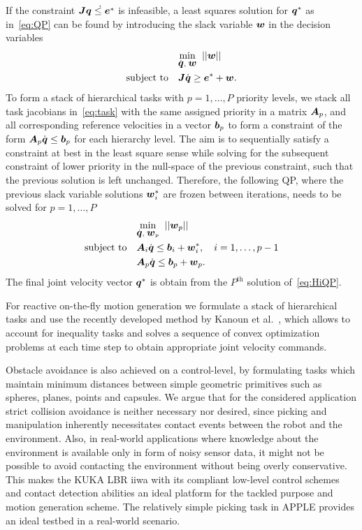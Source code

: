 If the constraint $\mbox{\boldmath $J$}\dot{\mbox{\boldmath $q$} \leq \mbox{\boldmath $e$}^*}$ is infeasible, a least squares solution for
$\mbox{\boldmath $q$}^*$ as in~\eqref{eq:QP} can be found by introducing the slack variable $\mbox{\boldmath $w$}$ in the
decision variables
%
\begin{align}\label{eq:iQP}
  &\underset{\dot{\mbox{\boldmath $q$}},\;\mbox{\boldmath $w$}}{\mbox{min}}\;\;||\mbox{\boldmath $w$}||\\
   \mbox{subject to} \quad &\mbox{\boldmath $J$}\dot{\mbox{\boldmath $q$}} \geq \mbox{\boldmath $e$}^* + \mbox{\boldmath $w$}. \nonumber
\end{align}
%
To form a stack of hierarchical tasks with $p=1,\dots,P$ priority levels, we stack all task
jacobians in~\eqref{eq:task} with the same assigned priority in a matrix $\mbox{\boldmath $A$}_p$, and all
corresponding reference velocities in a vector $\mbox{\boldmath $b$}_p$ to form a constraint of the form
$\mbox{\boldmath $A$}_p\dot{\mbox{\boldmath $q$}}\leq \mbox{\boldmath $b$}_p$ for each hierarchy level. The aim is to sequentially satisfy
a constraint at best in the least square sense while solving for the subsequent constraint of lower
priority in the null-space of the previous constraint, such that the previous solution is left
unchanged. Therefore, the following QP, where the previous slack variable solutions $\mbox{\boldmath $w$}_i^*$
are frozen between iterations, needs to be solved for $p=1,\ldots,P$
%
\begin{align}\label{eq:HiQP}
  &\underset{\dot{\mbox{\boldmath $q$}},\;\mbox{\boldmath $w$}_p}{\mbox{min}}\;\;||\mbox{\boldmath $w$}_p||\\
   \mbox{subject to} \quad &\mbox{\boldmath $A$}_i\dot{\mbox{\boldmath $q$}} \leq \mbox{\boldmath $b$}_i + \mbox{\boldmath $w$}_i^*, \quad i=1,\dots,p-1 \nonumber \\
                           &\mbox{\boldmath $A$}_p\dot{\mbox{\boldmath $q$}} \leq \mbox{\boldmath $b$}_p + \mbox{\boldmath $w$}_p.  \nonumber 
\end{align}
%
The final joint velocity vector $\mbox{\boldmath $q$}^*$ is obtain from the $P^{\mbox{th}}$ solution
of~\eqref{eq:HiQP}.

For reactive on-the-fly motion generation we formulate a stack of hierarchical tasks and use the
recently developed method by Kanoun et al.~\cite{Kano11}, which allows to account for inequality
tasks and solves a sequence of convex optimization problems at each time step to obtain
appropriate joint velocity commands.
 
Obstacle avoidance is also achieved on a control-level, by formulating tasks which maintain minimum
distances between simple geometric primitives such as spheres, planes, points and capsules. We argue
that for the considered application strict collision avoidance is neither necessary nor desired,
since picking and manipulation inherently necessitates contact events between the robot and the
environment. Also, in real-world applications where knowledge about the environment is available
only in form of noisy sensor data, it might not be possible to avoid contacting the environment
without being overly conservative. This makes the KUKA LBR iiwa with its compliant low-level control
schemes and contact detection abilities an ideal platform for the tackled purpose and motion
generation scheme. The relatively simple picking task in APPLE provides an ideal testbed in a
real-world scenario.



